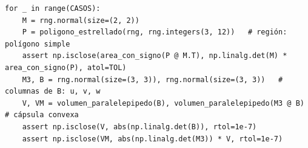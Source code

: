 %
\begin{lstlisting}
for _ in range(CASOS):
    M = rng.normal(size=(2, 2))
    P = poligono_estrellado(rng, rng.integers(3, 12))   # región: polígono simple
    assert np.isclose(area_con_signo(P @ M.T), np.linalg.det(M) * area_con_signo(P), atol=TOL)
    M3, B = rng.normal(size=(3, 3)), rng.normal(size=(3, 3))   # columnas de B: u, v, w
    V, VM = volumen_paralelepipedo(B), volumen_paralelepipedo(M3 @ B)   # cápsula convexa
    assert np.isclose(V, abs(np.linalg.det(B)), rtol=1e-7)
    assert np.isclose(VM, abs(np.linalg.det(M3)) * V, rtol=1e-7)
\end{lstlisting}
\comprobacionPie
